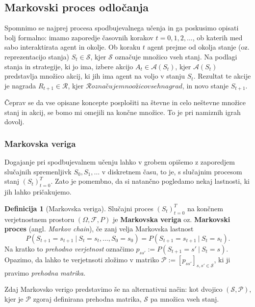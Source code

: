 \documentclass[12pt,a4paper]{amsart}
\theoremstyle{definition} %
\newtheorem{definicija}{Definicija}[section]
\theoremstyle{plain} %
\begin{document}
\subsection{Markovski proces odločanja}
Spomnimo se najprej procesa spodbujevalnega učenja in ga poskusimo opisati bolj formalno: 
imamo zaporedje časovnih korakov $t = 0, 1, 2, \dots$, ob katerih med sabo interaktirata agent 
in okolje. Ob koraku $t$ agent prejme od okolja stanje (oz. reprezentacijo stanja) $S_t \in 
\mathcal{S}$, kjer $\mathcal{S}$ označuje množico vseh stanj. Na podlagi stanja in strategije, 
ki jo ima, izbere akcijo $A_t \in \mathcal{A}(S_t)$, kjer $\mathcal{A}(S_t)$ predstavlja 
množico akcij, ki jih ima agent na voljo v stanju $S_t$. Rezultat te akcije je nagrada $R_{t+1} 
\in \mathcal{R}$, kjer $\mathcal{R} označuje mnoožico vseh nagrad$, in novo stanje $S_{t+1}$.

Čeprav se da vse opisane koncepte posplošiti na števne in celo neštevne množice stanj in akcij, 
se bomo mi omejili na končne množice. To je pri namiznih igrah dovolj.

\subsubsection{Markovska veriga}
Dogajanje pri spodbujevalnem učenju lahko v grobem opišemo z zaporedjem slučajnih spremenljivk $S_0,
S_1, \dots$ v diskretnem času, to je, s slučajnim procesom stanj $(S_t)_{t=0}^T$. Zato je pomembno, 
da si natančno pogledamo nekaj lastnosti, ki jih lahko pričakujemo. 

\begin{definicija}[Markovska veriga]
    Slučajni proces $(S_t)_{t=0}^T$ na končnem verjetnostnem prostoru 
    $(\Omega, \mathcal{F}, P)$ je \textbf{Markovska veriga} oz. \textbf{Markovski proces} (angl. 
    \textit{Markov chain}), če zanj velja Markovska lastnost
    $$
    P(S_{t+1} = s_{t+1}~|~S_{t} = s_{t}, \dots, S_0 = s_0) = P(S_{t+1} = s_{t+1}~|~S_{t} = s_{t}).
    $$
    Na kratko to \textit{prehodno verjetnost} označimo $p_{ss'} := P(S_{t+1} = s'~|~S_{t} = s)$.
    Opazimo, da lahko te verjetnsoti zložimo v matriko $\mathcal{P} := 
    [p_{ss'}]_{s,s'\in \mathcal{S} }$, ki ji pravimo \textit{prehodna matrika}.

    Zdaj Markovsko verigo predstavimo še na alternativni način: kot dvojico $(\mathcal{S}, 
    \mathcal{P})$, kjer je $\mathcal{P}$ zgoraj definirana prehodna matrika, $\mathcal{S}$ pa 
    množica vseh stanj.
\end{definicija}
\end{document}
